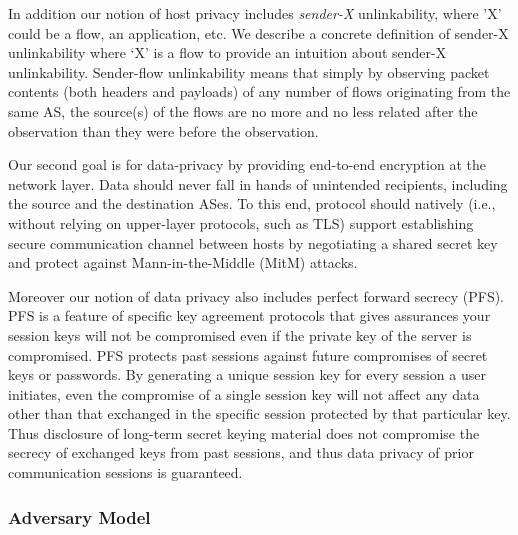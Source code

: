 In addition our notion of host privacy includes \textit{sender-X} unlinkability, where 'X' could be a flow, an application, etc. We describe a concrete definition of sender-X unlinkability where ‘X’ is a flow to provide an intuition about sender-X unlinkability. Sender-flow unlinkability means that simply by observing packet contents (both headers and payloads) of any number of flows originating from the same AS, the source(s) of the flows are no more and no less related after the observation than they were before the observation.

Our second goal is for data-privacy by providing end-to-end encryption at the network layer. Data should never fall in hands of unintended recipients, including the source and the destination ASes. To this end, protocol should natively (i.e., without relying on upper-layer protocols, such as TLS) support establishing secure communication channel between hosts by negotiating a shared secret key and protect against Mann-in-the-Middle (MitM) attacks.

Moreover our notion of data privacy also includes perfect forward secrecy (PFS). PFS is a feature of specific key agreement protocols that gives assurances your session keys will not be compromised even if the private key of the server is compromised. PFS protects past sessions against future compromises of secret keys or passwords. By generating a unique session key for every session a user initiates, even the compromise of a single session key will not affect any data other than that exchanged in the specific session protected by that particular key. Thus disclosure of long-term secret keying material does not compromise the secrecy of exchanged keys from past sessions, and thus data privacy of prior communication sessions is guaranteed.

\subsubsection{Adversary Model} 

